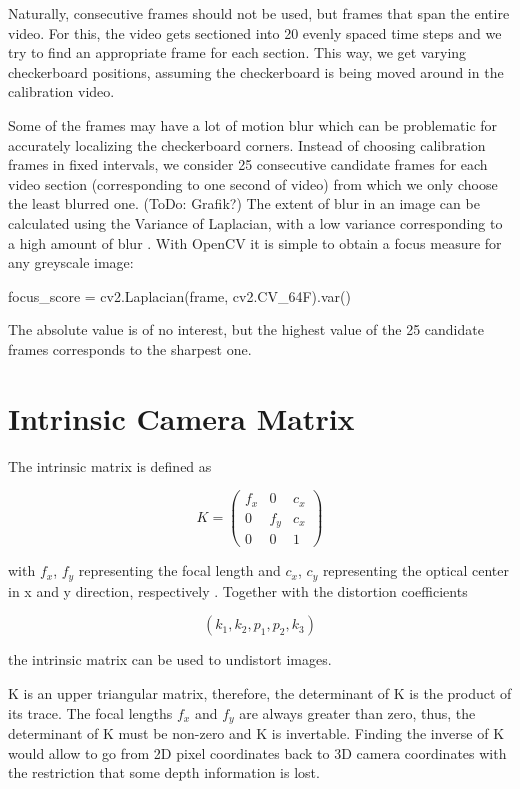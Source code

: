 \documentclass[bibliography=totoc]{scrartcl}
\begin{document}
Naturally, consecutive frames should not be used, but frames that span the entire video.
For this, the video gets sectioned into 20 evenly spaced time steps and we try to find an appropriate frame for each section.
This way, we get varying checkerboard positions, assuming the checkerboard is being moved around in the calibration video.

Some of the frames may have a lot of motion blur which can be problematic for accurately localizing the checkerboard corners.
Instead of choosing calibration frames in fixed intervals, we consider 25 consecutive candidate frames for each video section (corresponding to one second of video) from which we only choose the least blurred one. (ToDo: Grafik?)
The extent of blur in an image can be calculated using the Variance of Laplacian, with a low variance corresponding to a high amount of blur \cite{BlurDetection}.
With OpenCV it is simple to obtain a focus measure for any greyscale image:\\

\begin{python}
    focus_score = cv2.Laplacian(frame, cv2.CV_64F).var()
\end{python}

The absolute value is of no interest, but the highest value of the 25 candidate frames corresponds to the sharpest one.


\section{Intrinsic Camera Matrix}
The intrinsic matrix is defined as

$$
K =
\begin{pmatrix}
    f_x & 0 & c_x \\
    0 & f_y & c_x \\
    0 & 0 & 1
\end{pmatrix}
$$

with $f_x$, $f_y$ representing the focal length and $c_x$, $c_y$ representing the optical center in x and y direction, respectively \cite{CameraCalibration}.
Together with the distortion coefficients 

$$(k_1, k_2, p_1, p_2, k_3)$$

the intrinsic matrix can be used to undistort images.

K is an upper triangular matrix, therefore, the determinant of K is the product of its trace. 
The focal lengths $f_x$ and $f_y$ are always greater than zero, thus, the determinant of K must be non-zero and K is invertable.
Finding the inverse of K would allow to go from 2D pixel coordinates back to 3D camera coordinates with the restriction that some depth information is lost.
\end{document}
